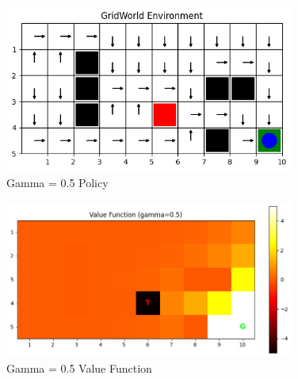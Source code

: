 \documentclass[12pt]{article}
\begin{document}
\begin{figure}[H]
  \centering
  \includegraphics[width=0.85\textwidth]{images/part2_q2_gamma_0.5_policy.png}
  \caption{Gamma = 0.5 Policy}
\end{figure}
\begin{figure}[H]
  \centering
  \includegraphics[width=0.85\textwidth]{images/part2_q2_gamma_0.5_value.png}
  \caption{Gamma = 0.5 Value Function}
\end{figure}
\end{document}
